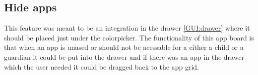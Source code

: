 \subsection{Hide apps}
\label{backlog:hide_apps}

This feature was meant to be an integration in the drawer \autoref{GUI:drawer} where it should be placed just under the colorpicker. The functionality of this app board is that when an app is unused or should not be acessable for a either a child or a guardian it could be put into the drawer and if there was an app in the drawer which the user needed it could be dragged back to the app grid.
